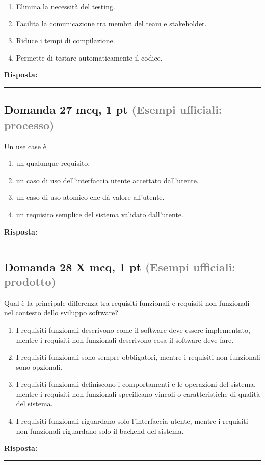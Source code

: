\documentclass[a4paper,11pt]{article}
\begin{document}
\begin{enumerate}[label=\alph*)]
\item Elimina la necessità del testing.
\item Facilita la comunicazione tra membri del team e stakeholder.
\item Riduce i tempi di compilazione.
\item Permette di testare automaticamente il codice.
\end{enumerate}
\vspace{0.2cm}
\noindent\textbf{Risposta:}\par
\vspace{1.5cm}\hrule


\subsection*{Domanda 27 \hfill {\small mcq, 1 pt \textcolor{gray}{(Esempi ufficiali: processo)}}}
Un use case è

\begin{enumerate}[label=\alph*)]
\item un qualunque requisito.
\item un caso di uso dell'interfaccia utente accettato dall'utente.
\item un caso di uso atomico che dà valore all'utente.
\item un requisito semplice del sistema validato dall'utente.
\end{enumerate}
\vspace{0.2cm}
\noindent\textbf{Risposta:}\par
\vspace{1.5cm}\hrule


\subsection*{Domanda 28 X \hfill {\small mcq, 1 pt \textcolor{gray}{(Esempi ufficiali: prodotto)}}}
Qual è la principale differenza tra requisiti funzionali e requisiti non funzionali nel contesto dello sviluppo software?

\begin{enumerate}[label=\alph*)]
\item I requisiti funzionali descrivono come il software deve essere implementato, mentre i requisiti non funzionali descrivono cosa il software deve fare.
\item I requisiti funzionali sono sempre obbligatori, mentre i requisiti non funzionali sono opzionali.
\item I requisiti funzionali definiscono i comportamenti e le operazioni del sistema, mentre i requisiti non funzionali specificano vincoli o caratteristiche di qualità del sistema.
\item I requisiti funzionali riguardano solo l'interfaccia utente, mentre i requisiti non funzionali riguardano solo il backend del sistema.
\end{enumerate}
\vspace{0.2cm}
\noindent\textbf{Risposta:}\par
\vspace{1.5cm}\hrule
\end{document}
